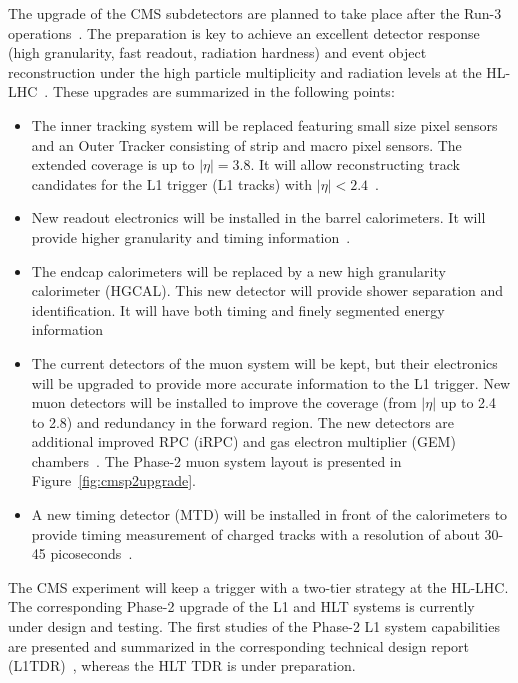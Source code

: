 The upgrade of the CMS subdetectors are planned to take place after the Run-3 operations~\cite{cmsphase2proposal}. The preparation is key to achieve an excellent detector response (high granularity, fast readout, radiation hardness) and event object reconstruction under the high particle multiplicity and radiation levels at the HL-LHC~\cite{hllhc}. These upgrades are summarized in the following points:
\begin{itemize}
    \item The inner tracking system will be replaced featuring small size pixel sensors and an Outer Tracker consisting of strip and macro pixel sensors. The extended coverage is up to $|\eta|=3.8$. It will allow reconstructing track candidates for the L1 trigger (L1 tracks) with $|\eta|<2.4$~\cite{cmsphase2tracker}. 
    \item New readout electronics will be installed in the barrel calorimeters. It will provide higher granularity and timing information~\cite{cmsphase2barrelcal}.
    \item The endcap calorimeters will be replaced by a new high granularity calorimeter (HGCAL). This new detector will provide shower separation and identification. It will have both timing and finely segmented energy information~\cite{cmsphase2endcapcal}
    \item The current detectors of the muon system will be kept, but their electronics will be upgraded to provide more accurate information to the L1 trigger. New muon detectors will be installed to improve the coverage (from $|\eta|$ up to 2.4 to 2.8) and redundancy in the forward region. The new detectors are additional improved RPC (iRPC) and gas electron multiplier (GEM) chambers~\cite{cmsphase2muons}. The Phase-2 muon system layout is presented in Figure~\ref{fig:cmsp2upgrade}.
    \item A new timing detector (MTD) will be installed in front of the calorimeters to provide timing measurement of charged tracks with a resolution of about 30-45 picoseconds~\cite{cmsphase2mtd}.
\end{itemize}

The CMS experiment will keep a trigger with a two-tier strategy at the HL-LHC. The corresponding Phase-2 upgrade of the L1 and HLT systems is currently under design and testing. The first studies of the Phase-2 L1 system capabilities are presented and summarized in the corresponding technical design report (L1TDR)~\cite{cmsphase2l1tdr}, whereas the HLT TDR is under preparation.

